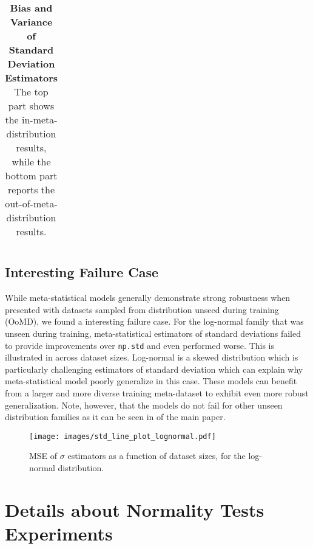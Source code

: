 \begin{table*}[t]
{\begin{tabular}{@{}l|ccc|ccc|ccc@{}}
\end{tabular}
}
\caption{\textbf{Bias and Variance of Standard Deviation Estimators} The top part shows the in-meta-distribution results, while the bottom part reports the out-of-meta-distribution results.}
\label{tab:imd_std_bias_variance}
\end{table*}

\subsection{Interesting Failure Case}
\label{app:failure}
While meta-statistical models generally demonstrate strong robustness when presented with datasets sampled from distribution unseed during training (OoMD), we found a interesting failure case. For the log-normal family that was unseen during training, meta-statistical estimators of standard deviations failed to provide improvements over \texttt{np.std} and even performed worse. This is illustrated in  across dataset sizes. Log-normal is a skewed distribution which is particularly challenging estimators of standard deviation which can explain why meta-statistical model poorly generalize in this case. These models can benefit from a larger and more diverse training meta-dataset to exhibit even more robust generalization. Note, however, that the models do not fail for other unseen distribution families as it can be seen in  of the main paper.


\begin{figure}
    \centering
    \texttt{[image: images/std\_line\_plot\_lognormal.pdf]}
    \caption{MSE of $\sigma$ estimators as a function of dataset sizes, for the log-normal distribution.}
    \label{fig:std_line_plot_failure}
\end{figure}



\section{Details about Normality Tests Experiments}
\label{app:norm_test}

